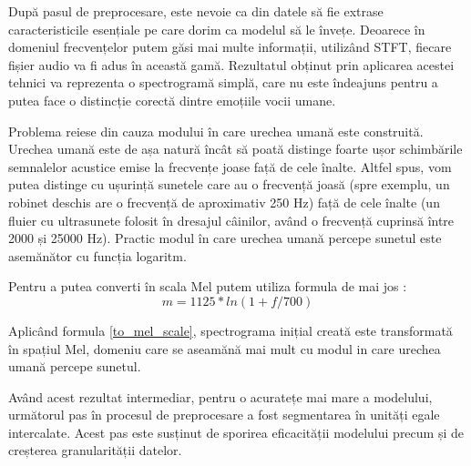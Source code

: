 \documentclass[a4paper, 12pt]{report}
\begin{document}
	După pasul de preprocesare, este nevoie ca din datele să fie extrase caracteristicile esențiale pe care dorim ca modelul să le învețe. Deoarece în domeniul frecvențelor putem găsi mai multe informații, utilizând STFT, fiecare fișier audio va fi adus în această gamă. Rezultatul obținut prin aplicarea acestei tehnici va reprezenta o spectrogramă simplă, care nu este îndeajuns pentru a putea face o distincție corectă dintre emoțiile vocii umane. 
	
	Problema reiese din cauza modului în care urechea umană este construită. Urechea umană este de așa natură încât să poată distinge foarte ușor schimbările semnalelor acustice emise la frecvențe joase față de cele înalte. Altfel spus, vom putea distinge cu ușurință sunetele care au o frecvență joasă (spre exemplu, un robinet deschis are o frecvență de aproximativ 250 Hz) față de cele înalte (un fluier cu ultrasunete folosit în dresajul câinilor, având o frecvență cuprinsă între 2000 și 25000 Hz). Practic modul în care urechea umană percepe sunetul este asemănător cu funcția logaritm.
	
	Pentru a putea converti în scala Mel putem utiliza formula de mai jos :
	\begin{equation}
	\label{to_mel_scale}
		m=1125 * ln(1+f/700)
	\end{equation}
	
	Aplicând formula \ref{to_mel_scale}, spectrograma inițial creată este transformată în spațiul Mel, domeniu care se aseamănă mai mult cu modul in care urechea umană percepe sunetul.
	
	Având acest rezultat intermediar, pentru o acuratețe mai mare a modelului, următorul pas în procesul de preprocesare a fost segmentarea în unități egale intercalate. Acest pas este susținut de sporirea eficacității modelului precum și de creșterea granularității datelor.
	
\end{document}
